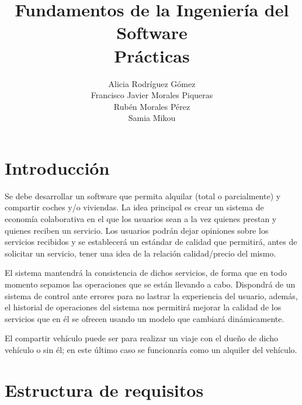 \documentclass[11pt,spanish]{article} %
\title{Fundamentos de la Ingeniería del Software \\ Prácticas}
\author{Alicia Rodríguez Gómez \\ Francisco Javier Morales Piqueras\\ Rubén Morales Pérez\\ Samia Mikou}
\date{ }
\begin{document}
\maketitle
\tableofcontents %
\newpage
\setlength\parindent{0pt} %


\section{Introducción}
Se debe desarrollar un software que permita alquilar (total o parcialmente) y compartir coches y/o viviendas. 
La idea principal es crear un sistema de economía colaborativa en el que los usuarios sean a la vez quienes prestan y quienes reciben un servicio. Los usuarios podrán dejar opiniones sobre los servicios recibidos y se establecerá un estándar de calidad que permitirá, antes de solicitar un servicio, tener una idea de la relación calidad/precio del mismo.

El sistema mantendrá la consistencia de dichos servicios, de forma que en todo momento sepamos las operaciones que se están llevando a cabo.
Dispondrá de un sistema de control ante errores para no lastrar la experiencia del usuario, además, el historial de operaciones del sistema nos permitirá mejorar la calidad de los servicios que en él se ofrecen usando un modelo que cambiará dinámicamente.




El compartir vehículo puede ser para realizar un viaje con el dueño de
dicho vehículo o sin él; en este último caso se funcionaría como un alquiler del
vehículo.

\section{Estructura de requisitos}
\end{document}
